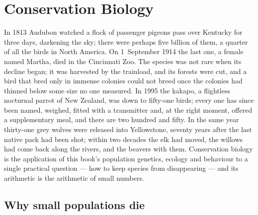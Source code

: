 \chapter{Conservation Biology}\label{ch:b3:conservation-biology}

In 1813 Audubon watched a flock of passenger pigeons pass over
Kentucky for three days, darkening the sky; there were perhaps five
billion of them, a quarter of all the birds in North America. On
1~September 1914 the last one, a female named Martha, died in the
Cincinnati Zoo. The species was not rare when its decline began; it
was harvested by the trainload, and its forests were cut, and a bird
that bred only in immense colonies could not breed once the colonies
had thinned below some size no one measured. In 1995 the kakapo, a
flightless nocturnal parrot of New Zealand, was down to fifty-one
birds; every one has since been named, weighed, fitted with a
transmitter and, at the right moment, offered a supplementary meal,
and there are two hundred and fifty. In the same year thirty-one grey
wolves were released into Yellowstone, seventy years after the last
native pack had been shot; within two decades the elk had moved, the
willows had come back along the rivers, and the beavers with them.
Conservation biology is the application of this book's population
genetics, ecology and behaviour to a single practical question --- how
to keep species from disappearing --- and its arithmetic is the
arithmetic of small numbers.

\section{Why small populations die}

